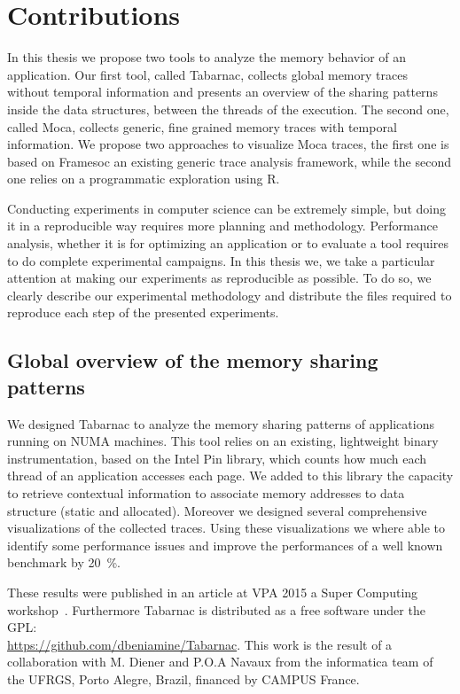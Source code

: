 \section{Contributions}

In this thesis we propose two tools to analyze the memory behavior of an application.
Our first tool, called \gls{Tabarnac}, collects global memory traces without temporal information and presents an overview of the sharing patterns inside the data structures, between the threads of the execution.
The second one, called \gls{Moca}, collects generic, fine grained  memory traces with temporal information.
We propose two approaches to visualize \gls{Moca} traces, the first one is based on \gls{Framesoc} an existing generic trace analysis framework, while the second one relies on a programmatic exploration using \gls{R}.

Conducting experiments in computer science can be extremely simple, but doing it in a reproducible way requires more planning and methodology.
Performance analysis, whether it is for optimizing an application or to evaluate a tool requires to do complete experimental campaigns.
In this thesis we, we take a particular attention at making our experiments as reproducible as possible.
To do so, we clearly describe our experimental methodology and distribute the files required to reproduce each step of the presented experiments.

\subsection{Global overview of the memory sharing patterns}

We designed \gls{Tabarnac} to analyze the memory sharing patterns of applications running on \gls{NUMA} machines.
This tool relies on an existing, lightweight binary instrumentation, based on the \gls{Intel} \gls{Pin} library, which counts how much each thread of an application accesses each page.
We added to this library the capacity to retrieve contextual information to associate memory addresses to data structure (static and allocated).
Moreover we designed several comprehensive visualizations of the collected traces.
Using these visualizations we where able to identify some performance issues and improve the performances of a well known benchmark by \SI{20}{\%}.

These results were published in an article at \gls{VPA} 2015 a Super Computing workshop~\cite{Beniamine15TABARNAC}.
Furthermore \gls{Tabarnac} is distributed as a free software under the \gls{GPL}:\\
\url{https://github.com/dbeniamine/Tabarnac}.
This work is the result of a collaboration with M. Diener and P.O.A Navaux from the informatica team of the \gls{UFRGS}, Porto Alegre, Brazil, financed by CAMPUS France.

